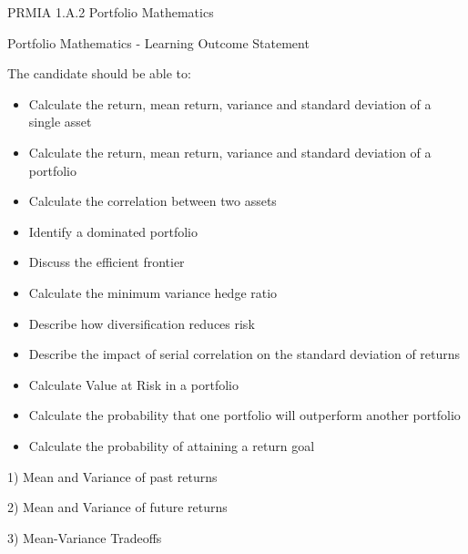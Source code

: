 
PRMIA 1.A.2 Portfolio Mathematics


Portfolio Mathematics - Learning Outcome Statement

The candidate should be able to:
\begin{itemize}
\item 	 Calculate the return, mean return, variance and standard deviation of a single asset
	
	
\item 	 Calculate the return, mean return, variance and standard deviation of a portfolio
	
	
\item 	 Calculate the correlation between two assets
	
	
\item 	 Identify a dominated portfolio
	
	
\item 	 Discuss the efficient frontier
	
	
\item 	 Calculate the minimum variance hedge ratio
	
	
\item 	 Describe how diversification reduces risk
	
	
\item 	 Describe the impact of serial correlation on the standard deviation of returns
	
	
\item 	 Calculate Value at Risk in a portfolio
	
	
\item 	 Calculate the probability that one portfolio will outperform another portfolio
	
	
\item 	 Calculate the probability of attaining a return goal
\end{itemize}


1) Mean and Variance of past returns

2) Mean and Variance of future returns

3) Mean-Variance Tradeoffs


